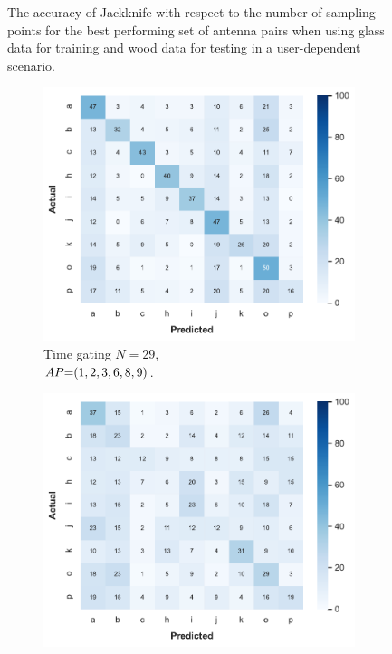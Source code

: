 \begin{figure}[ht]
  \vspace{-6pt}
  \caption{The accuracy of Jackknife with respect to the number of sampling points for the best performing set of antenna pairs when using glass data for training and wood data for testing in a user-dependent scenario.}
  \label{fig:radar-experiments:through-materials:glass-wood-samples}
\end{figure}

\begin{figure}[ht]
  \begin{subfigure}{.49\textwidth}
      \centering
      \includegraphics[width=.99\linewidth]{Figures/RadarExperiments/Datasets/ThroughMaterials/Glass+Wood/confusion-timegating-ud.pdf}
      \vspace{-15pt}
      \captionsetup{width=.99\linewidth}
      \caption{Time gating $N{=}29$, \\ $\splitatcommas{AP{=}(1, 2, 3, 6, 8, 9)}$.}
      \label{fig:radar-experiments:through-materials:glass-wood-confusion:timegating-ud}
  \end{subfigure}
  \begin{subfigure}{.49\textwidth}
      \centering
      \includegraphics[width=.99\linewidth]{Figures/RadarExperiments/Datasets/ThroughMaterials/Glass+Wood/confusion-filtering-ud.pdf}

\end{subfigure}
\end{figure}
